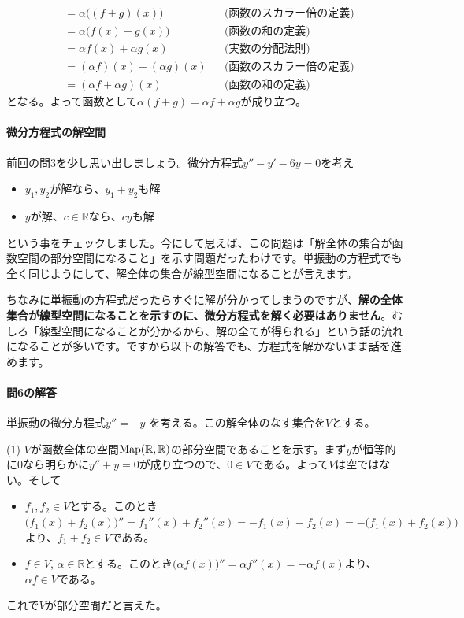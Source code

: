 \begin{itemize}
\begin{itemize}
\begin{align*}
&= \alpha\bigl((f + g)(x)\bigr) & & \text{(函数のスカラー倍の定義)} \\
&= \alpha\bigl(f(x) + g(x)\bigr) & & \text{(函数の和の定義)} \\
&= \alpha f(x) + \alpha g(x) & & \text{(実数の分配法則)} \\
&= (\alpha f)(x) + (\alpha g)(x) & & \text{(函数のスカラー倍の定義)} \\
&= (\alpha f + \alpha g)(x) & & \text{(函数の和の定義)}
\end{align*}
となる。よって函数として$\alpha(f + g) = \alpha f + \alpha g$が成り立つ。
\end{itemize}
\end{itemize}

\paragraph{微分方程式の解空間}

前回の問$3$を少し思い出しましょう。微分方程式$y'' - y' - 6y = 0$を考え
\begin{itemize}
\item $y_1, y_2$が解なら、$y_1 + y_2$も解
\item $y$が解、$c\in\mathbb{R}$なら、$cy$も解
\end{itemize}
という事をチェックしました。今にして思えば、この問題は「解全体の集合が函数空間の部分空間になること」を示す問題だったわけです。単振動の方程式でも全く同じようにして、解全体の集合が線型空間になることが言えます。

ちなみに単振動の方程式だったらすぐに解が分かってしまうのですが、\textbf{解の全体集合が線型空間になることを示すのに、微分方程式を解く必要はありません}。むしろ「線型空間になることが分かるから、解の全てが得られる」という話の流れになることが多いです。ですから以下の解答でも、方程式を解かないまま話を進めます。

\paragraph{問6の解答} 単振動の微分方程式$y'' = -y$ を考える。この解全体のなす集合を$V$とする。

\noindent (1) $V$が函数全体の空間$\operatorname{Map}(\mathbb{R}, \mathbb{R})$の部分空間であることを示す。まず$y$が恒等的に$0$なら明らかに$y'' + y = 0$が成り立つので、$0\in V$である。よって$V$は空ではない。そして
\begin{itemize}
\item $f_1, f_2 \in V$とする。このとき$\bigl(f_1(x) + f_2(x)\bigr)'' = f_1''(x) + f_2''(x) = -f_1(x) - f_2(x) = -\bigl(f_1(x) + f_2(x)\bigr)$より、$f_1 + f_2 \in V$である。
\item $f \in V$, $\alpha\in\mathbb{R}$とする。このとき$\bigl(\alpha f(x)\bigr)'' = \alpha f''(x) = -\alpha f(x)$より、$\alpha f \in V$である。
\end{itemize}
これで$V$が部分空間だと言えた。

